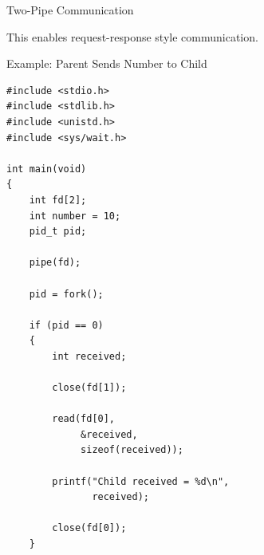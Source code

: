 \documentclass[aspectratio=169]{beamer}
\begin{document}
\begin{frame}{Two-Pipe Communication}

\begin{center}


\end{center}

\vspace{0.5cm}

This enables request-response style communication.

\end{frame}

\begin{frame}[fragile]{Example: Parent Sends Number to Child}

\begin{lstlisting}[style=cstyle]
#include <stdio.h>
#include <stdlib.h>
#include <unistd.h>
#include <sys/wait.h>

int main(void)
{
    int fd[2];
    int number = 10;
    pid_t pid;

    pipe(fd);

    pid = fork();

    if (pid == 0)
    {
        int received;

        close(fd[1]);

        read(fd[0],
             &received,
             sizeof(received));

        printf("Child received = %d\n",
               received);

        close(fd[0]);
    }
\end{lstlisting}

\end{frame}
\end{document}
